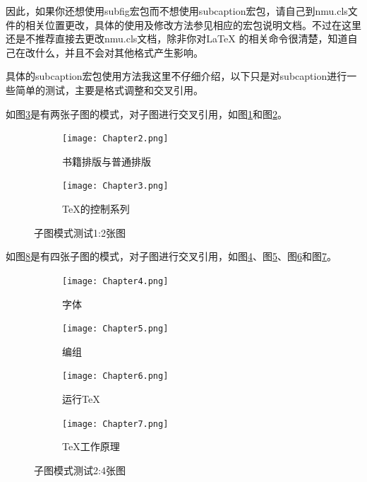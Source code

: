 因此，如果你还想使用subfig宏包而不想使用subcaption宏包，请自己到nmu.cls文件的相关位置更改，具体的使用及修改方法参见相应的宏包说明文档。不过在这里还是不推荐直接去更改nmu.cls文档，除非你对\LaTeX{} 的相关命令很清楚，知道自己在改什么，并且不会对其他格式产生影响。

具体的subcaption宏包使用方法我这里不仔细介绍，以下只是对subcaption进行一些简单的测试，主要是格式调整和交叉引用。

如图\ref{fig:subfig_test1}是有两张子图的模式，对子图进行交叉引用，如图\ref{subfig:1a}和图\ref{subfig:1b}。

\begin{figure}[htb]
	\centering
	\begin{subfigure}[b]{.35\textwidth}
		\centering
		\texttt{[image: Chapter2.png]}
		\caption{书籍排版与普通排版}\label{subfig:1a}
	\end{subfigure}
	\quad
	\begin{subfigure}[b]{.35\textwidth}
		\centering
		\texttt{[image: Chapter3.png]}
		\caption{\TeX 的控制系列}\label{subfig:1b}
	\end{subfigure}
	\caption{子图模式测试1:2张图}\label{fig:subfig_test1}
\end{figure}

如图\ref{fig:subfig_test2}是有四张子图的模式，对子图进行交叉引用，如图\ref{subfig:2a}、图\ref{subfig:2b}、图\ref{subfig:2c}和图\ref{subfig:2d}。

\begin{figure}[htb]
	\centering
	\begin{subfigure}[b]{.35\textwidth}
		\centering
		\texttt{[image: Chapter4.png]}
		\caption{字体}\label{subfig:2a}
	\end{subfigure}
	\begin{subfigure}[b]{.35\textwidth}
		\centering
		\texttt{[image: Chapter5.png]}
		\caption{编组}\label{subfig:2b}
	\end{subfigure}
	\begin{subfigure}[b]{.35\textwidth}
		\centering
		\texttt{[image: Chapter6.png]}
		\caption{运行\TeX}\label{subfig:2c}
	\end{subfigure}
	\begin{subfigure}[b]{.35\textwidth}
		\centering
		\texttt{[image: Chapter7.png]}
		\caption{\TeX 工作原理}\label{subfig:2d}
	\end{subfigure}
	\caption{子图模式测试2:4张图}\label{fig:subfig_test2}
\end{figure}

